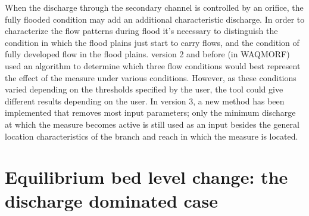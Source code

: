 When the discharge through the secondary channel is controlled by an orifice, the fully flooded condition may add an additional characteristic discharge.
In order to characterize the flow patterns during flood it's necessary to distinguish the condition in which the flood plains just start to carry flows, and the condition of fully developed flow in the flood plains.
\dfastmi version 2 and before (in WAQMORF) used an algorithm to determine which three flow conditions would best represent the effect of the measure under various conditions.
However, as these conditions varied depending on the thresholds specified by the user, the tool could give different results depending on the user.
In \dfastmi version 3, a new method has been implemented that removes most input parameters; only the minimum discharge at which the measure becomes active is still used as an input besides the general location characteristics of the branch and reach in which the measure is located.


\section{Equilibrium bed level change: the discharge dominated case}

